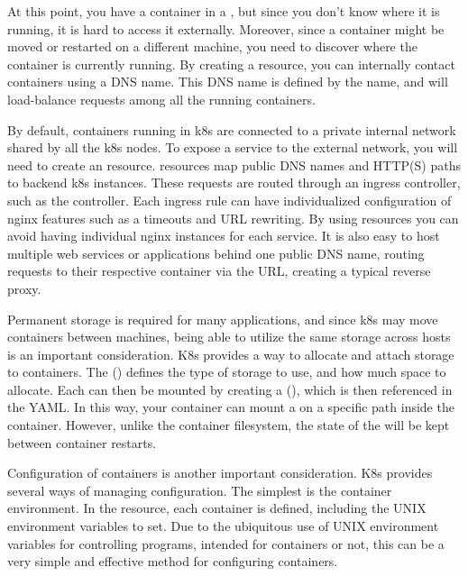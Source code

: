 \documentclass[11pt,twoside]{article}
\begin{document}
At this point, you have a container in a , but since you don't know
where it is running, it is hard to access it externally.
Moreover, since a container might be moved or restarted on a different machine, you need to discover
where the container is currently running.  By creating
a  resource, you can internally contact containers using a DNS name.
This DNS name is defined by the  name, and will load-balance
requests among all the running containers.

By default, containers running in k8s are connected to a private internal network shared by all
the k8s nodes.  To expose a service to the external network, you will need to create an 
resource.   resources map public DNS names and HTTP(S) paths
to backend k8s  instances.  These requests are routed through an ingress
controller, such as the  controller.  Each ingress rule can have
individualized configuration of nginx features such as a timeouts and URL rewriting.
By using  resources you can avoid having individual nginx instances for each service.
It is also easy to host multiple web services or applications behind one public DNS name,
routing requests to their respective container via the URL, creating a typical reverse proxy.

Permanent storage is required for many applications, and since k8s may move containers
between machines, being able to utilize the same storage across hosts is an important
consideration.  K8s provides a way to allocate and attach storage to containers.
The  () defines the type of storage to use, and how
much space to allocate.  Each  can then be mounted by creating a  (), which is then referenced in the  YAML.  In this way, your
container can mount a  on a specific path inside the container.
However, unlike the container filesystem, the state of the  will be kept
between container restarts.

Configuration of containers is another important consideration.  K8s provides several ways of
managing configuration.  The simplest is the container environment.  In the 
resource, each container is defined, including the UNIX environment variables to set.
Due to the ubiquitous use of UNIX environment variables for controlling programs, intended for
containers or not, this can be a very simple and effective method for configuring containers.
\end{document}
